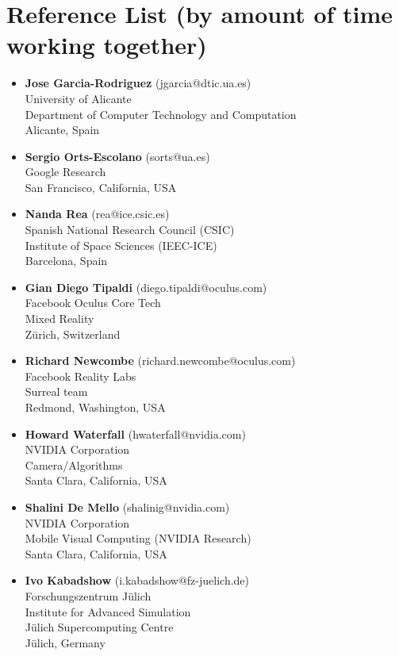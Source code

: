 \documentclass[8pt]{article}
\begin{document}
\section*{Reference List (by amount of time working together)}
\begin{itemize}
	\item {\textbf{Jose Garcia-Rodriguez} (jgarcia@dtic.ua.es)\\
    University of Alicante\\
    Department of Computer Technology and Computation\\
    Alicante, Spain\\}

  \item {\textbf{Sergio Orts-Escolano} (sorts@ua.es)\\
  Google Research\\
  San Francisco, California, USA\\}

  \item {\textbf{Nanda Rea} (rea@ice.csic.es)\\
  Spanish National Research Council (CSIC)\\
  Institute of Space Sciences (IEEC-ICE)\\
  Barcelona, Spain\\}

  \item {\textbf{Gian Diego Tipaldi} (diego.tipaldi@oculus.com)\\
  Facebook Oculus Core Tech\\
  Mixed Reality\\
  Zürich, Switzerland\\}

  \item {\textbf{Richard Newcombe} (richard.newcombe@oculus.com)\\
  Facebook Reality Labs\\
  Surreal team\\
  Redmond, Washington, USA\\}

  \item {\textbf{Howard Waterfall} (hwaterfall@nvidia.com)\\
	NVIDIA Corporation\\
	Camera/Algorithms\\
	Santa Clara, California, USA\\}

  \item{\textbf{Shalini De Mello} (shalinig@nvidia.com)\\
	NVIDIA Corporation\\
	Mobile Visual Computing (NVIDIA Research)\\
	Santa Clara, California, USA\\}

  \item {\textbf{Ivo Kabadshow} (i.kabadshow@fz-juelich.de)\\
  Forschungszentrum Jülich\\
  Institute for Advanced Simulation\\
  Jülich Supercomputing Centre\\
  Jülich, Germany\\}


\end{itemize}
 
\end{document}
